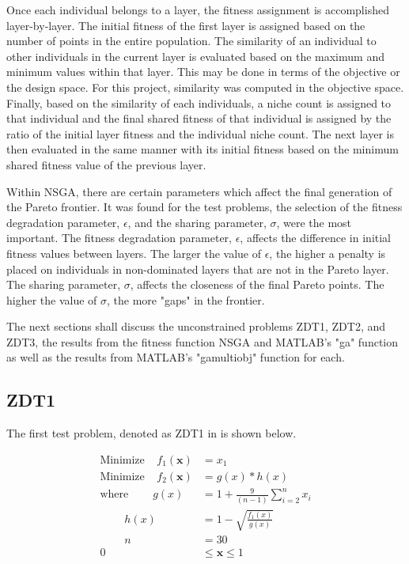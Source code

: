 \documentclass{article}
\begin{document}
\noindent Once each individual belongs to a layer, the fitness assignment is accomplished layer-by-layer. The initial fitness of the first layer is assigned based on the number of points in the entire population. The similarity of an individual to other individuals in the current layer is evaluated based on the maximum and minimum values within that layer. This may be done in terms of the objective or the design space. For this project, similarity was computed in the objective space. Finally, based on the similarity of each individuals, a niche count is assigned to that individual and the final shared fitness of that individual is assigned by the ratio of the initial layer fitness and the individual niche count. The next layer is then evaluated in the same manner with its initial fitness based on the minimum shared fitness value of the previous layer. \newline 

\noindent Within NSGA, there are certain parameters which affect the final generation of the Pareto frontier. It was found for the test problems, the selection of the fitness degradation parameter, $\epsilon$, and the sharing parameter, $\sigma$, were the most important. The fitness degradation parameter, $\epsilon$, affects the difference in initial fitness values between layers. The larger the value of $\epsilon$, the higher a penalty is placed on individuals in non-dominated layers that are not in the Pareto layer. The sharing parameter, $\sigma$, affects the closeness of the final Pareto points. The higher the value of $\sigma$, the more "gaps" in the frontier.  \newline

\noindent The next sections shall discuss the unconstrained problems ZDT1, ZDT2, and ZDT3, the results from the fitness function NSGA and MATLAB's "ga" function as well as the results from MATLAB's "gamultiobj" function for each. 
\newpage
\subsection{ZDT1} 
The first test problem, denoted as ZDT1 in \cite{deb2001multi} is shown below. 


\begin{align*}
\textrm{Minimize} ~~~~~ f_1(\textbf{x}) &= x_1 \\
\textrm{Minimize} ~~~~~ f_2(\textbf{x}) &= g(x)*h(x) \\
\textrm{where} ~~~~~~~~~~ g(x) &= 1+\frac{9}{(n-1)}\sum_{i=2}^{n}x_i \\
~~~~~~~~~~ h(x) &= 1- \sqrt{\frac{f_1(x)}{g(x)}} \\
~~~~~~~~~~ n &= 30 \\
0 &\leq  \textbf{x}  \leq 1 \\
\end{align*}
\end{document}
